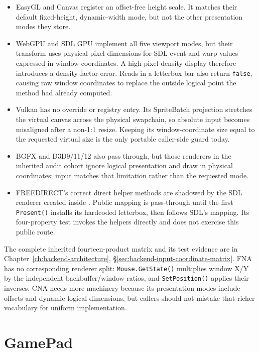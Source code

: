 \begin{itemize}
\item EasyGL and Canvas register an offset-free height scale. It matches their default
  fixed-height, dynamic-width mode, but not the other presentation modes they store.
\item WebGPU and SDL GPU implement all five viewport modes, but their transform uses physical
  pixel dimensions for SDL event and warp values expressed in window coordinates. A
  high-pixel-density display therefore introduces a density-factor error. Reads in a
  letterbox bar also return \texttt{false}, causing raw window coordinates to replace the
  outside logical point the method had already computed.
\item Vulkan has no override or registry entry. Its SpriteBatch projection stretches the
  virtual canvas across the physical swapchain, so absolute input becomes misaligned after a
  non-1:1 resize. Keeping its window-coordinate size equal to the requested virtual size is
  the only portable caller-side guard today.
\item BGFX and D3D9/11/12 also pass through, but those renderers in the inherited audit cohort ignore logical
  presentation and draw in physical coordinates; input matches that limitation rather than
  the requested mode.
\item FREEDIRECT's correct direct helper methods are shadowed by the SDL renderer created inside
  . Public mapping is pass-through until the first
  \texttt{Present()} installs its hardcoded letterbox, then follows SDL's mapping. Its
  four-property test invokes the helpers directly and does not exercise this public route.
\end{itemize}

The complete inherited fourteen-product matrix and its test evidence are in
Chapter~\ref{ch:backend-architecture},
\S\ref{sec:backend-input-coordinate-matrix}. FNA has no corresponding renderer split:
\texttt{Mouse.GetState()} multiplies window X/Y by the independent backbuffer/window ratios,
and \texttt{SetPosition()} applies their inverses. CNA needs more machinery because its
presentation modes include offsets and dynamic logical dimensions, but callers should not
mistake that richer vocabulary for uniform implementation.

\section{GamePad}

